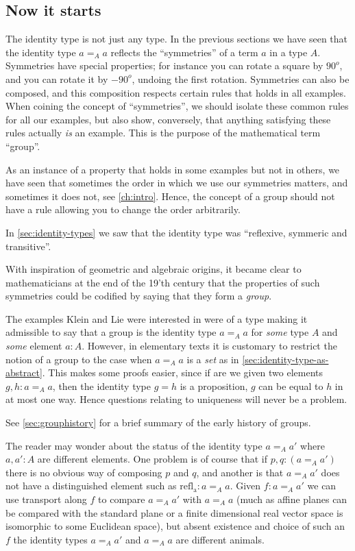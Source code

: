 \begin{definition}
\section{Now it starts}
The identity type is not just any type.  In the previous sections we have seen that the identity type $a=_Aa$ reflects the ``symmetries'' of a term $a$ in a type $A$.  Symmetries have special properties; for instance you can rotate a square by $90^o$, and you can rotate it by $-90^o$, undoing the first rotation.
Symmetries can also be composed, and this composition respects certain rules that holds in all examples.  When coining the concept of ``symmetries'', we should isolate these common rules for all our examples, but also show, conversely, that anything satisfying these rules actually \emph{is} an example.  This is the purpose of the mathematical term ``group''.

As an instance of a property that holds in some examples but not in others, we have seen that sometimes the order in which we use our symmetries matters, and sometimes it does not, see \cref{ch:intro}.  Hence, the concept of a group should not have a rule allowing you to change the order arbitrarily.

In \cref{sec:identity-types} we saw that the identity type was ``reflexive, symmeric and transitive''.


With inspiration of geometric and algebraic origins, it became clear to mathematicians at the end of the 19'th century that the properties of such symmetries could be codified by saying that they form a \emph{group}.

The examples Klein and Lie were interested in were of a type making it admissible to say that a group is the identity type $a=_Aa$ for \emph{some} type $A$ and \emph{some} element $a:A$.
However, in elementary texts it is customary to restrict the notion of a group to the case when $a=_Aa$ is a \emph{set} as in \cref{sec:identity-type-as-abstract}.  This makes some proofs easier, since if are we given two elements $g,h:a=_Aa$, then the identity type $g=h$ is a proposition, \ie $g$ can be equal to $h$ in at most one way.  Hence questions relating to uniqueness will never be a problem.



See \cref{sec:grouphistory} for a brief summary of the early history of groups.
\begin{remark}
  The reader may wonder about the status of the identity type $a=_Aa'$ where $a,a':A$ are different elements.  One problem is of course that if $p,q:(a=_Aa')$ there is no obvious way of composing $p$ and $q$, and another is that $a=_Aa'$ does not have a distinguished element such as $\mathrm{refl{}_a}:a=_Aa$.
Given $f:a=_Aa'$ we can use transport along $f$ to compare $a=_Aa'$ with $a=_Aa$ (much as affine planes can be compared with the standard plane or a finite dimensional real vector space is isomorphic to some Euclidean space), but absent existence and choice of such an $f$ the identity types $a=_Aa'$ and $a=_Aa$ are different animals.
\end{remark}



\end{definition}
